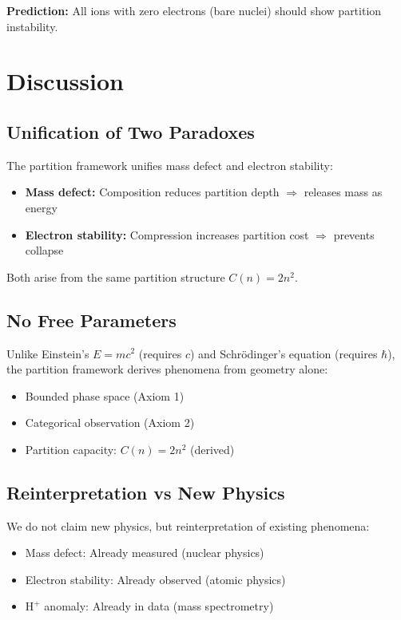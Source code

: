 \documentclass[12pt,a4paper]{article}
\begin{document}
\textbf{Prediction:} All ions with zero electrons (bare nuclei) should show partition instability.

\section{Discussion}

\subsection{Unification of Two Paradoxes}

The partition framework unifies mass defect and electron stability:

\begin{itemize}
\item \textbf{Mass defect:} Composition reduces partition depth $\Rightarrow$ releases mass as energy
\item \textbf{Electron stability:} Compression increases partition cost $\Rightarrow$ prevents collapse
\end{itemize}

Both arise from the same partition structure $C(n) = 2n^2$.

\subsection{No Free Parameters}

Unlike Einstein's $E=mc^2$ (requires $c$) and Schrödinger's equation (requires $\hbar$), the partition framework derives phenomena from geometry alone:

\begin{itemize}
\item Bounded phase space (Axiom 1)
\item Categorical observation (Axiom 2)
\item Partition capacity: $C(n) = 2n^2$ (derived)
\end{itemize}

\subsection{Reinterpretation vs New Physics}

We do not claim new physics, but reinterpretation of existing phenomena:

\begin{itemize}
\item Mass defect: Already measured (nuclear physics)
\item Electron stability: Already observed (atomic physics)
\item $\text{H}^+$ anomaly: Already in data (mass spectrometry)
\end{itemize}
\end{document}
